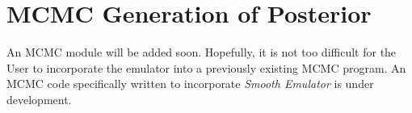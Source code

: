 \documentclass[main.tex]{subfiles}
\begin{document}
\setcounter{section}{6}
\section{MCMC Generation of Posterior}\label{sec:mcmc}

An MCMC module will be added soon. Hopefully, it is not too difficult for the User to incorporate the emulator into a previously existing MCMC program. An MCMC code specifically written to incorporate {\it Smooth Emulator} is under development.
\end{document}
